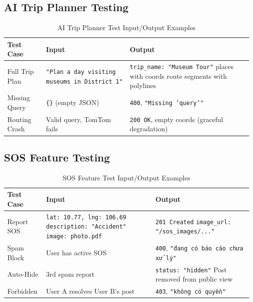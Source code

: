 \subsection{AI Trip Planner Testing}

\begin{table}[H]
    \centering
    \renewcommand{\arraystretch}{1.3}
    \footnotesize
    \begin{tabularx}{\textwidth}{|p{3cm}|p{4.5cm}|X|}
        \hline
        \textbf{Test Case} & \textbf{Input} & \textbf{Output} \\
        \hline
        Full Trip Plan & \texttt{"Plan a day visiting museums in District 1"} & \texttt{trip\_name: "Museum Tour"} \newline 3 places with coords \newline 2 route segments with polylines \\
        \hline
        Missing Query & \texttt{\{\}} (empty JSON) & \texttt{400}, \texttt{"Missing 'query'"} \\
        \hline
        Routing Crash & Valid query, TomTom fails & \texttt{200 OK}, empty coords \newline (graceful degradation) \\
        \hline
    \end{tabularx}
    \caption{AI Trip Planner Test Input/Output Examples}
\end{table}

\subsection{SOS Feature Testing}

\begin{table}[H]
    \centering
    \renewcommand{\arraystretch}{1.3}
    \footnotesize
    \begin{tabularx}{\textwidth}{|p{3cm}|p{4.5cm}|X|}
        \hline
        \textbf{Test Case} & \textbf{Input} & \textbf{Output} \\
        \hline
        Report SOS & \texttt{lat: 10.77, lng: 106.69} \newline \texttt{description: "Accident"} \newline \texttt{image: photo.pdf} & \texttt{201 Created} \newline \texttt{image\_url: "/sos\_images/..."} \\
        \hline
        Spam Block & User has active SOS & \texttt{400}, \texttt{"đang có báo cáo chưa xử lý"} \\
        \hline
        Auto-Hide & 3rd spam report & \texttt{status: "hidden"} \newline Post removed from public view \\
        \hline
        Forbidden & User A resolves User B's post & \texttt{403}, \texttt{"không có quyền"} \\
        \hline
    \end{tabularx}
    \caption{SOS Feature Test Input/Output Examples}
\end{table}

